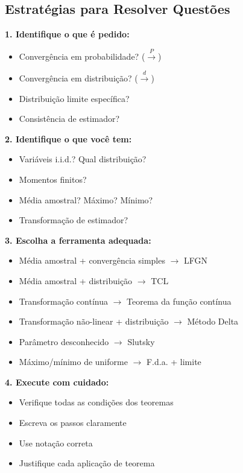 \documentclass[12pt,a4paper]{article}
\theoremstyle{definition}
\theoremstyle{remark}
\begin{document}
\subsection{Estratégias para Resolver Questões}

\textbf{1. Identifique o que é pedido:}
\begin{itemize}
    \item Convergência em probabilidade? ($\xrightarrow{P}$)
    \item Convergência em distribuição? ($\xrightarrow{d}$)
    \item Distribuição limite específica?
    \item Consistência de estimador?
\end{itemize}

\textbf{2. Identifique o que você tem:}
\begin{itemize}
    \item Variáveis i.i.d.? Qual distribuição?
    \item Momentos finitos?
    \item Média amostral? Máximo? Mínimo?
    \item Transformação de estimador?
\end{itemize}

\textbf{3. Escolha a ferramenta adequada:}
\begin{itemize}
    \item Média amostral + convergência simples $\to$ LFGN
    \item Média amostral + distribuição $\to$ TCL
    \item Transformação contínua $\to$ Teorema da função contínua
    \item Transformação não-linear + distribuição $\to$ Método Delta
    \item Parâmetro desconhecido $\to$ Slutsky
    \item Máximo/mínimo de uniforme $\to$ F.d.a. + limite
\end{itemize}

\textbf{4. Execute com cuidado:}
\begin{itemize}
    \item Verifique todas as condições dos teoremas
    \item Escreva os passos claramente
    \item Use notação correta
    \item Justifique cada aplicação de teorema
\end{itemize}
\end{document}
